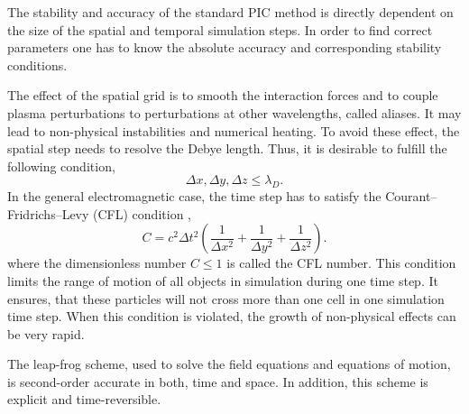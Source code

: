 The stability and accuracy of the standard PIC method is directly dependent on the size of the spatial and temporal simulation steps. In order to find correct parameters one has to know the absolute accuracy and corresponding stability conditions.

The effect of the spatial grid is to smooth the interaction forces and to couple plasma perturbations to perturbations at other wavelengths, called aliases. It may lead to non-physical instabilities and numerical heating. To avoid these effect, the spatial step needs to resolve the Debye length. Thus, it is desirable to fulfill the following condition,
\begin{equation}
\Delta x, \Delta y, \Delta z \leq \lambda_{D}.
\end{equation}
In the general electromagnetic case, the time step has to satisfy the Courant--Fridrichs--Levy (CFL) condition \cite{jaroszynsky},
\begin{equation}
\label{3.1.4.1}
C = c^{2} \Delta t^{2} \left(\frac{1}{\Delta x^{2}} + \frac{1}{\Delta y^{2}} + \frac{1}{\Delta z^{2}}\right) .
\end{equation}
where the dimensionless number $ C \leq 1 $ is called the CFL number. This condition limits the range of motion of all objects in simulation during one time step. It ensures, that these particles will not cross more than one cell in one simulation time step. When this condition is violated, the growth of non-physical effects can be very rapid. 

The leap-frog scheme, used to solve the field equations and equations of motion, is second-order accurate in both, time and space. In addition, this scheme is explicit and time-reversible.